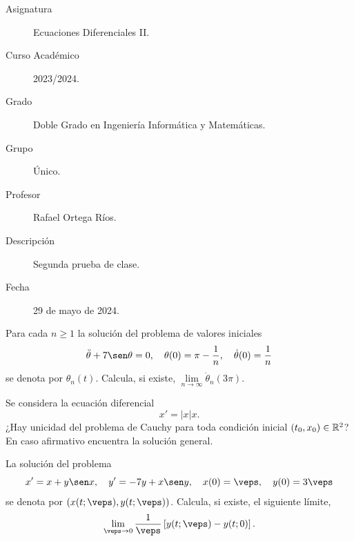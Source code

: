 \documentclass[12pt]{article}
\begin{document}

    
    

    \begin{description}
        \item[Asignatura] Ecuaciones Diferenciales II.
        \item[Curso Académico] 2023/2024.
        \item[Grado] Doble Grado en Ingeniería Informática y Matemáticas.
        \item[Grupo] Único.
        \item[Profesor] Rafael Ortega Ríos.
        \item[Descripción] Segunda prueba de clase.
        \item[Fecha] 29 de mayo de 2024.
    
    \end{description}
    \newpage


    
    \begin{ejercicio}
        Para cada $n \geq 1$ la solución del problema de valores iniciales
        \[
        \ddot{\theta} + 7 \sen \theta = 0, \quad \theta(0) = \pi - \frac{1}{n}, \quad \dot{\theta}(0) = \frac{1}{n}
        \]
        se denota por $\theta_n(t)$. Calcula, si existe, $\lim\limits_{n \to \infty} \dot{\theta}_n(3\pi)$.
    \end{ejercicio}

    \begin{ejercicio}
        Se considera la ecuación diferencial
        \[
        x' = |x|x.
        \]
        ¿Hay unicidad del problema de Cauchy para toda condición inicial $(t_0, x_0) \in \mathbb{R}^2$? En caso afirmativo encuentra la solución general.
    \end{ejercicio}

    \begin{ejercicio}
        La solución del problema
        \[
        x' = x + y \sen x, \quad y' = -7y + x \sen y, \quad x(0) = \veps, \quad y(0) = 3\veps
        \]
        se denota por $(x(t; \veps), y(t; \veps))$. Calcula, si existe, el siguiente límite,
        \[
        \lim\limits_{\veps \to 0} \frac{1}{\veps} \left[y(t; \veps) - y(t; 0)\right].
        \]
    \end{ejercicio}
\end{document}
